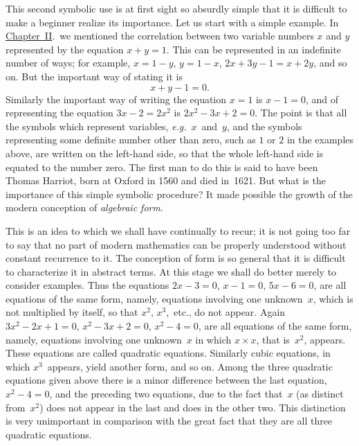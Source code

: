 \documentclass[12pt,leqno]{book}[2005/09/16]
\newcommand{\Chg}[2]{#2}
\newcommand{\ChapRef}[2][Chapter]{\hyperref[chapter:#2]{\Chg{#1}{Chapter}~#2}}
\newcommand{\PageSep}[1]{\ignorespaces}
\newcommand{\eg}{\emph{e.g.}}
\begin{document}
This second symbolic use is at first sight
so absurdly simple that it is difficult to make
a beginner realize its importance. Let us
start with a simple example. In \ChapRef{II}.\
we mentioned the correlation between two
variable numbers $x$ and $y$ represented by the
equation $x + y = 1$. This can be represented
in an indefinite number of ways; for example,
$x = 1 - y$, $y = 1 - x$, $2x + 3y - 1 = x + 2y$, and so
on. But the important way of stating it is
\[
x + y - 1 = 0.
\]
Similarly the important way of writing the
equation $x = 1$ is $x - 1 = 0$, and of representing
the equation $3x - 2 = 2x^{2}$ is $2x^{2} - 3x + 2 = 0$.
The point is that all the symbols which represent
variables, \eg\ $x$~and~$y$, and the symbols
\PageSep{66}
representing some definite number other than
zero, such as $1$ or $2$ in the examples above,
are written on the left-hand side, so that the
whole left-hand side is equated to the number
zero. The first man to do this is said to
have been Thomas Harriot, born at Oxford
%
in 1560 and died in~1621. But what is the
importance of this simple symbolic procedure?
It made possible the growth of the
%
modern conception of \emph{algebraic form}.

This is an idea to which we shall have continually
to recur; it is not going too far to
say that no part of modern mathematics can
be properly understood without constant recurrence
to it. The conception of form is
so general that it is difficult to characterize
it in abstract terms. At this stage we shall
do better merely to consider examples. Thus
the equations $2x - 3 = 0$, $x - 1 = 0$, $5x - 6 = 0$,
are all equations of the same form, namely,
equations involving one unknown~$x$, which is
not multiplied by itself, so that $x^{2}$, $x^{3}$,~etc., do
not appear. Again $3x^{2} - 2x + 1 = 0$, $x^{2} - 3x + 2 = 0$,
$x^{2} - 4 = 0$, are all equations of the same
form, namely, equations involving one unknown~$x$
in which $x × x$, that is~$x^{2}$, appears. These
equations are called quadratic equations.
Similarly cubic equations, in which $x^{3}$~appears,
yield another form, and so on. Among the
three quadratic equations given above there
is a minor difference between the last equation,
\PageSep{67}
$x^{2} - 4 = 0$, and the preceding two equations,
due to the fact that~$x$ (as distinct
from~$x^{2}$) does not appear in the last and
does in the other two. This distinction is
very unimportant in comparison with the
great fact that they are all three quadratic
equations.
\end{document}
